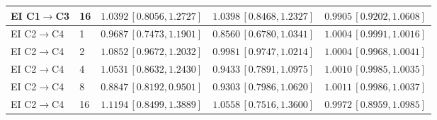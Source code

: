 \begin{table}[p]
\begin{tabular*}{\linewidth}{@{\extracolsep{\fill}}llrrr@{}}
EI C1$\to$C3 & 16 & $1.0392\,[0.8056,1.2727]$ & $1.0398\,[0.8468,1.2327]$ & $0.9905\,[0.9202,1.0608]$\\
\midrule
EI C2$\to$C4 & 1 & $0.9687\,[0.7473,1.1901]$ & $0.8560\,[0.6780,1.0341]$ & $1.0004\,[0.9991,1.0016]$\\
EI C2$\to$C4 & 2 & $1.0852\,[0.9672,1.2032]$ & $0.9981\,[0.9747,1.0214]$ & $1.0004\,[0.9968,1.0041]$\\
EI C2$\to$C4 & 4 & $1.0531\,[0.8632,1.2430]$ & $0.9433\,[0.7891,1.0975]$ & $1.0010\,[0.9985,1.0035]$\\
EI C2$\to$C4 & 8 & $0.8847\,[0.8192,0.9501]$ & $0.9303\,[0.7986,1.0620]$ & $1.0011\,[0.9986,1.0037]$\\
EI C2$\to$C4 & 16 & $1.1194\,[0.8499,1.3889]$ & $1.0558\,[0.7516,1.3600]$ & $0.9972\,[0.8959,1.0985]$\\
\bottomrule
\end{tabular*}
\end{table}
\clearpage

